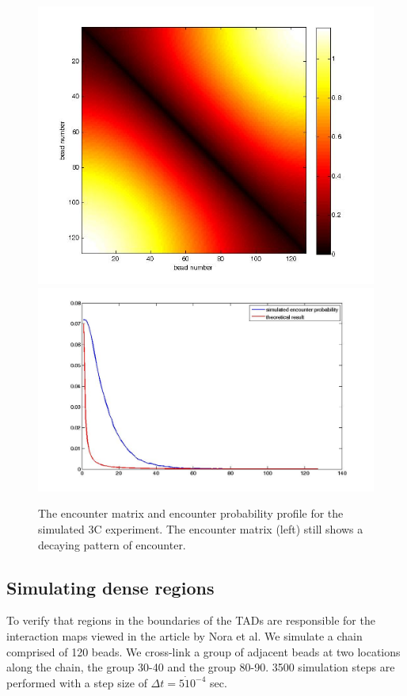\documentclass[12pt]{paper}
\begin{document}
\begin{figure}[H]
\includegraphics[scale=0.2]{encounterMatrix3cExperiment}
\includegraphics[scale=0.2]{encounterProbabilityBead1OfThe3cSimulation128Beads}
\caption{The encounter matrix and encounter probability profile for the simulated 3C experiment. The encounter matrix (left) still shows a decaying pattern of encounter.}
\end{figure}

\subsection{Simulating dense regions}
To verify that regions in the boundaries of the TADs are responsible for the interaction maps viewed in the article by Nora et al. We simulate a chain comprised of 120 beads. We cross-link a group of adjacent beads at two locations along the chain, the group 30-40 and the group 80-90. 3500 simulation steps are performed with a step size of $\Delta t = 5\dot10^{-4}$ sec. 
\end{document}
